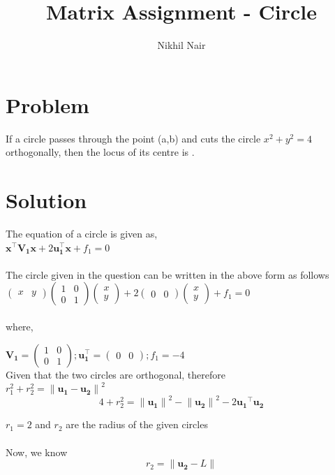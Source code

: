 \documentclass[journal,12pt,twocolumn]{IEEEtran}
\title{\mytitle}
\title{
Matrix Assignment - Circle
}
\author{Nikhil Nair}
\newcommand{\myvec}[1]{\ensuremath{\begin{pmatrix}#1\end{pmatrix}}}
\let\vec\mathbf
\begin{document}
\maketitle
\tableofcontents
\bigskip


\section{\textbf{Problem}}
If  a circle passes through the point (a,b) and cuts the circle $x^2+y^2=4$ orthogonally, then the locus of its centre is .\\


\section{\textbf{Solution}}
The equation of a circle is given as,   \\

${\vec{x^{\top}V_1 x} + 2\vec{u_1^{\top}x}} + f_1=0$
\\
\\
The circle given in the question can be written in the above form as follows
\\

$\myvec{x & y}\myvec{1&0\\ 0&1}\myvec{x\\y} + 2\myvec{0&0}\myvec{x\\y} + f_1 = 0$\\
\\
where,

$\vec{V_1}=\myvec{1&0\\ 0&1} ; \vec{u_1^{\top}}=\myvec{0&0} ; f_1=-4$
\\

Given that the two circles are orthogonal, therefore
\\

$r_1^2 + r_2^2 = {\lVert \vec{u_1} - \vec{u_2} \rVert}^2$
\\
\begin{equation}
4 + r_2^2 = {\lVert \vec{u_1} \rVert}^2 -{\lVert \vec{u_2} \rVert}^2 -2 \vec{ u_1}^{\top}\vec{u_2} \label{eq-1}
\end{equation}

$r_1=2$ and $r_2$ are the radius of the given circles
\\
\\
Now, we know
\begin{equation}
r_2=\lVert{ \vec{u_2} - L}\rVert
\end{equation}             \label{eq-2}
\\
\\
\end{document}
